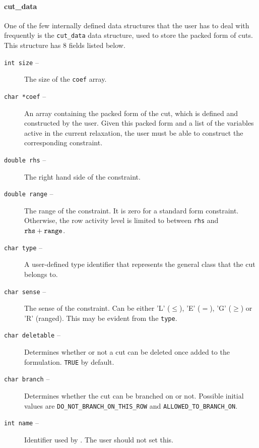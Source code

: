 \begin{description}

\begin{htmlonly}
\paragraph{cut\_data}
\end{htmlonly}
\begin{latexonly}
\end{latexonly}
\label{cut_data}

One of the few internally defined data structures that the user has to
deal with frequently is the {\tt cut\_data} data structure, used to
store the packed form of cuts. This structure has 8 fields listed
below.
\begin{description}
\item [{\tt int size} --] The size of the {\tt coef} array.
\item [{\tt char *coef} --] An array containing the packed form of the
cut, which is defined and constructed by the user. Given this packed
form and a list of the variables active in the current relaxation, the
user must be able to construct the corresponding constraint.
\item [{\tt double rhs} --] The right hand side of the constraint.
\item [{\tt double range} --] The range of the constraint. It is zero for
a standard form constraint. Otherwise, the row activity level is
limited to between {\tt rhs} and ${\tt rhs}+{\tt range}$.
\item [{\tt char type} --] A user-defined type identifier that represents the
general class that the cut belongs to.
\item [{\tt char sense} --] The sense of the constraint. Can be either 'L' 
($\leq$), 'E' ($=$), 'G' ($\geq$) or 'R' (ranged). This may be evident
from the {\tt type}.
\item [{\tt char deletable} --] Determines whether or not a cut can be
deleted once added to the formulation. {\tt TRUE} by default.
\item [{\tt char branch} --] Determines whether the cut can be branched
on or not. Possible initial values are {\tt DO\_NOT\_BRANCH\_ON\_THIS\_ROW}
and {\tt ALLOWED\_TO\_BRANCH\_ON}.
\item [{\tt int name} --] Identifier used by \BB. The user should not
set this.
\end{description}


\end{description}
